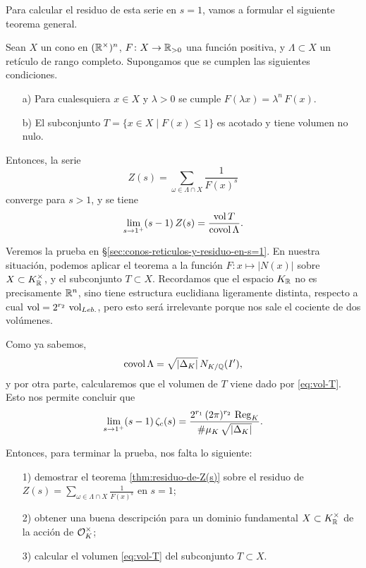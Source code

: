 Para calcular el residuo de esta serie en $s = 1$, vamos a formular el siguiente
teorema general.

\begin{teorema}
  \label{thm:residuo-de-Z(s)}
  Sean $X$ un cono en $(\mathbb{R}^\times)^n$, $F\colon X\to \mathbb{R}_{>0}$ una función
  positiva, y $\Lambda \subset X$ un retículo de rango completo. Supongamos que
  se cumplen las siguientes condiciones.
  \begin{enumerate}
  \item[a)] Para cualesquiera $x \in X$ y $\lambda > 0$ se cumple
    $F (\lambda x) = \lambda^n\,F (x)$.

  \item[b)] El subconjunto $T = \{ x\in X \mid F (x) \le 1 \}$ es acotado
    y tiene volumen no nulo.
  \end{enumerate}
  Entonces, la serie
  $$Z (s) = \sum_{\omega \in \Lambda \cap X} \frac{1}{F (x)^s}$$
  converge para $s > 1$, y se tiene
  $$\lim_{s \to 1^+} (s-1)\,Z (s) = \frac{\operatorname{vol} T}{\operatorname{covol} \Lambda}.$$
\end{teorema}

Veremos la prueba en \S\ref{sec:conos-reticulos-y-residuo-en-s=1}.
En nuestra situación, podemos aplicar el teorema a la función
$F\colon x \mapsto |N (x)|$ sobre $X \subset K_{\mathbb{R}}^\times$,
y el subconjunto $T \subset X$. Recordamos que el espacio $K_{\mathbb{R}}$ no es
precisamente $\mathbb{R}^n$, sino tiene estructura euclidiana ligeramente distinta,
respecto a cual $\operatorname{vol} = 2^{r_2}\,\operatorname{vol}_{Leb.}$, pero esto será irrelevante porque
nos sale el cociente de dos volúmenes.

Como ya sabemos,
$$\operatorname{covol} \Lambda = \sqrt{|\Delta_K|}\,N_{K/\mathbb{Q}} (I'),$$
y por otra parte, calcularemos que el volumen de $T$ viene dado por
\eqref{eq:vol-T}. Esto nos permite concluir que
$$\lim_{s\to 1^+} (s-1)\,\zeta_c (s) = \frac{2^{r_1}\,(2\pi)^{r_2}\,\operatorname{Reg}_K}{\#\mu_K\,\sqrt{|\Delta_K|}}.$$

Entonces, para terminar la prueba, nos falta lo siguiente:
\begin{itemize}
\item[1)] demostrar el teorema \ref{thm:residuo-de-Z(s)} sobre el residuo de
  $Z (s) = \sum_{\omega \in \Lambda \cap X} \frac{1}{F (x)^s}$ en $s = 1$;
\item[2)] obtener una buena descripción para un dominio fundamental
  $X \subset K_{\mathbb{R}}^\times$ de la acción de $\mathcal{O}_K^\times$;
\item[3)] calcular el volumen \eqref{eq:vol-T} del subconjunto $T \subset X$.
\end{itemize}

